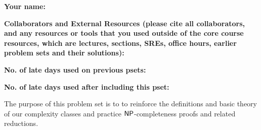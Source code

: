 \documentclass[11pt]{article}
\begin{document}


\textbf{Your name: }

\textbf{Collaborators and External Resources (please cite all collaborators, and any resources or tools that you used outside of the core course resources, which are lectures, sections, SREs, office hours, earlier problem sets and their solutions):}

\vspace{0.1in}


\textbf{No. of late days used on previous psets: }

\textbf{No. of late days used after including this pset: }


\vspace{0.2in}

\noindent The purpose of this problem set is to to reinforce the definitions and basic theory of our complexity classes and practice $\mathsf{NP}$-completeness proofs and related reductions. 
\end{document}
